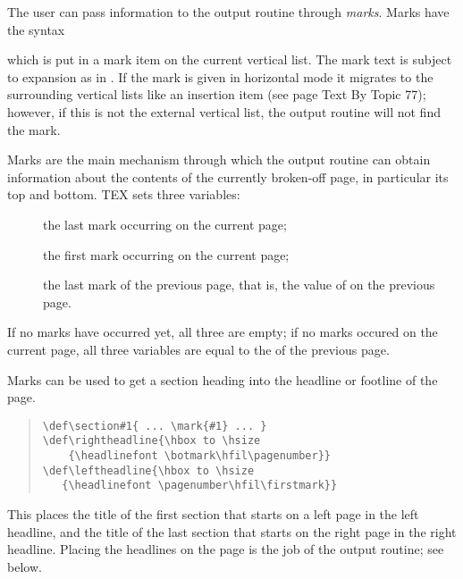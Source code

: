 The user can pass information to the output routine through \textit{marks}. Marks have the syntax

\begin{teX}
\end{teX}

which is put in a mark item on the current vertical list. The mark text is subject to expansion
as in .
If the mark is given in horizontal mode it migrates to the surrounding vertical lists like an
insertion item (see page Text By Topic 77); however, if this is not the external vertical list, the output routine
will not find the mark.

Marks are the main mechanism through which the output routine can obtain information
about the contents of the currently broken-off page, in particular its top and bottom. TEX sets
three variables:

\begin{description}
\item[] the last mark occurring on the current page;
\item[] the first mark occurring on the current page;
\item[] the last mark of the previous page, that is, the value of  on the previous page.
\end{description}



If no marks have occurred yet, all three are empty; if no marks occured on the current page, all three variables are equal to the  of the previous page. 

Marks can be used to get a section heading into the headline or footline of the page.

\begin{quote}
\begin{verbatim}
\def\section#1{ ... \mark{#1} ... }
\def\rightheadline{\hbox to \hsize
    {\headlinefont \botmark\hfil\pagenumber}}
\def\leftheadline{\hbox to \hsize
   {\headlinefont \pagenumber\hfil\firstmark}}
\end{verbatim}
\end{quote}

This places the title of the first section that starts on a left page in the left
headline, and the title of the last section that starts on the right page in
the right headline. Placing the headlines on the page is the job of the output
routine; see below.

